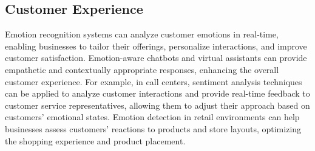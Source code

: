 \subsection{Customer Experience}
Emotion recognition systems can analyze customer emotions in real-time, enabling businesses to tailor their offerings, 
personalize interactions, and improve customer satisfaction. Emotion-aware chatbots and virtual assistants can provide empathetic and contextually appropriate responses, 
enhancing the overall customer experience. 
For example, in call centers, sentiment analysis techniques can be applied to analyze customer interactions and provide real-time feedback to customer service representatives, 
allowing them to adjust their approach based on customers' emotional states.
Emotion detection in retail environments can help businesses assess customers' reactions to products and store layouts, optimizing the shopping experience and product placement.
